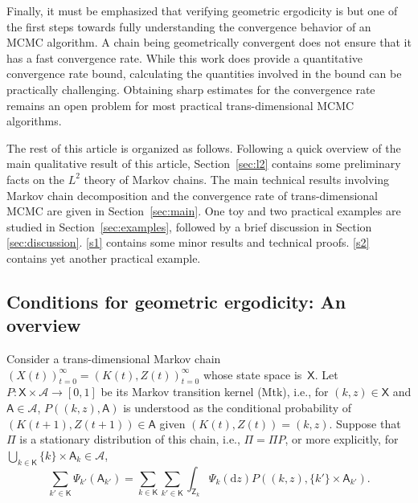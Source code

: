 \documentclass[12pt]{article}
\newcommand{\df}{\mathrm{d}}
\newcommand{\X}{\mathsf{X}}
\newcommand{\Z}{\mathsf{Z}}
\newcommand{\SF}{\mathcal{A}}
\begin{document}
Finally, it must be emphasized that verifying geometric ergodicity is but one of the first steps towards fully understanding the convergence behavior of an MCMC algorithm.
A chain being geometrically convergent does not ensure that it has a fast convergence rate.
While this work does provide a quantitative convergence rate bound, calculating the quantities involved in the bound can be practically challenging.
Obtaining sharp estimates for the convergence rate remains an open problem for most practical trans-dimensional MCMC algorithms.


The rest of this article is organized as follows.
Following a quick overview of the main qualitative result of this article, Section~\ref{sec:l2} contains some preliminary facts on the $L^2$ theory of Markov chains.
The main technical results involving Markov chain decomposition and the convergence rate of trans-dimensional MCMC are given in Section~\ref{sec:main}.
One toy and two practical examples are studied in Section~\ref{sec:examples}, followed by a brief discussion in Section \ref{sec:discussion}.
\ref{s1} contains some minor results and technical proofs.
\ref{s2} contains yet another practical example.


\subsection{Conditions for geometric ergodicity: An overview}


Consider a trans-dimensional Markov chain $(X(t))_{t=0}^{\infty} = (K(t), Z(t))_{t=0}^{\infty}$ whose state space is~$\X$.
Let $P: \X \times \SF \to [0,1]$ be its Markov transition kernel (Mtk), i.e., for $(k,z) \in \X$ and $\mathsf{A} \in \SF$, $P((k,z), \mathsf{A})$ is understood as the conditional probability of $(K(t+1), Z(t+1)) \in \mathsf{A}$ given $(K(t), Z(t)) = (k,z)$.
Suppose that~$\Pi$ is a stationary distribution of this chain, i.e., $\Pi = \Pi P$, or more explicitly, for $\bigcup_{k \in \mathsf{K}} \{k\} \times \mathsf{A}_k \in \SF$,
\[
\sum_{k' \in \mathsf{K}} \Psi_{k'}(\mathsf{A}_{k'}) = \sum_{k \in \mathsf{K}} \sum_{k' \in \mathsf{K}} \int_{\Z_k} \Psi_k(\df z) P((k,z),  \{k'\} \times \mathsf{A}_{k'}).
\]
\end{document}
